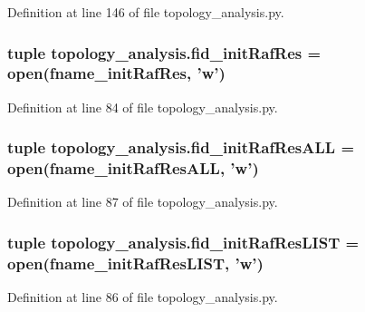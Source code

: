 Definition at line 146 of file topology\+\_\+analysis.\+py.

\hypertarget{a00159_aa47d62b7ce95f5c4e730d081209770c2}{
\subsubsection[{fid\+\_\+init\+Raf\+Res}]{\setlength{\rightskip}{0pt plus 5cm}tuple topology\+\_\+analysis.\+fid\+\_\+init\+Raf\+Res = open({\bf fname\+\_\+init\+Raf\+Res}, 'w')}}\label{a00159_aa47d62b7ce95f5c4e730d081209770c2}


Definition at line 84 of file topology\+\_\+analysis.\+py.

\hypertarget{a00159_afcacf140d9efed55635e8dcd084db870}{
\subsubsection[{fid\+\_\+init\+Raf\+Res\+A\+L\+L}]{\setlength{\rightskip}{0pt plus 5cm}tuple topology\+\_\+analysis.\+fid\+\_\+init\+Raf\+Res\+A\+L\+L = open({\bf fname\+\_\+init\+Raf\+Res\+A\+L\+L}, 'w')}}\label{a00159_afcacf140d9efed55635e8dcd084db870}


Definition at line 87 of file topology\+\_\+analysis.\+py.

\hypertarget{a00159_abca13a03834449d5629252329999f1a3}{
\subsubsection[{fid\+\_\+init\+Raf\+Res\+L\+I\+S\+T}]{\setlength{\rightskip}{0pt plus 5cm}tuple topology\+\_\+analysis.\+fid\+\_\+init\+Raf\+Res\+L\+I\+S\+T = open({\bf fname\+\_\+init\+Raf\+Res\+L\+I\+S\+T}, 'w')}}\label{a00159_abca13a03834449d5629252329999f1a3}


Definition at line 86 of file topology\+\_\+analysis.\+py.

